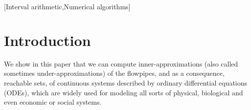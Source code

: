 \documentclass{sig-alternate-05-2015} %
\newcommand\ForAuthors[1]%
 {\par\smallskip                     %
  \begin{center}%
   \fbox%
   {\parbox{0.9\linewidth}%
    {\raggedright\sc--- #1}%
   }%
  \end{center}%
  \par\smallskip                     %
 }
\begin{document}
[Interval arithmetic,Numerical algorithms]



\section{Introduction}
%


We show in this paper that we can compute inner-approxi\-mations (also called sometimes 
under-approximations) of the flowpipes, and as a consequence, reachable sets, 
of continuous systems described by ordinary differential
equations (ODEs), which 
are widely used for modeling all sorts of physical, biological and even economic or
social systems. 
\end{document}
